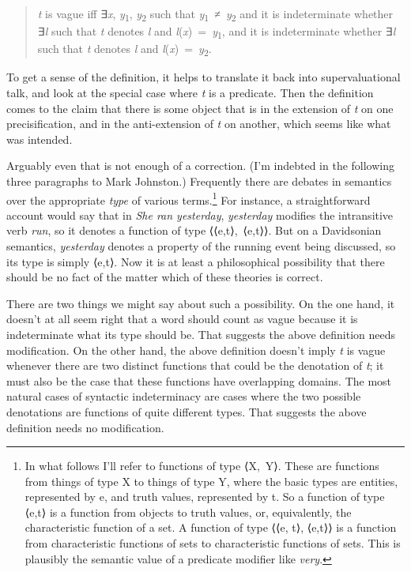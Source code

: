 \documentclass[
  11pt,
  letterpaper,
  DIV=11,
  numbers=noendperiod,
  twoside]{scrartcl}
\begin{document}
\begin{quote}
\emph{t} is vague iff ∃\emph{x}, \emph{y}\textsubscript{1},
\emph{y}\textsubscript{2} such that
\emph{y}\textsubscript{1}~≠~\emph{y}\textsubscript{2} and it is
indeterminate whether ∃\emph{l} such that \emph{t} denotes \emph{l} and
\emph{l}(\emph{x})~=~\emph{y}\textsubscript{1}, and it is indeterminate
whether ∃\emph{l} such that \emph{t} denotes \emph{l} and
\emph{l}(\emph{x})~=~\emph{y}\textsubscript{2}.
\end{quote}

To get a sense of the definition, it helps to translate it back into
supervaluational talk, and look at the special case where \emph{t} is a
predicate. Then the definition comes to the claim that there is some
object that is in the extension of \emph{t} on one precisification, and
in the anti-extension of \emph{t} on another, which seems like what was
intended.

Arguably even that is not enough of a correction. (I'm indebted in the
following three paragraphs to Mark Johnston.) Frequently there are
debates in semantics over the appropriate \emph{type} of various
terms.\footnote{In what follows I'll refer to functions of type ⟨X,~Y⟩.
  These are functions from things of type X to things of type Y, where
  the basic types are entities, represented by e, and truth values,
  represented by t. So a function of type ⟨e,t⟩ is a function from
  objects to truth values, or, equivalently, the characteristic function
  of a set. A function of type ⟨⟨e, t⟩, ⟨e,t⟩⟩ is a function from
  characteristic functions of sets to characteristic functions of sets.
  This is plausibly the semantic value of a predicate modifier like
  \emph{very}.} For instance, a straightforward account would say that
in \emph{She ran yesterday}, \emph{yesterday} modifies the intransitive
verb \emph{run}, so it denotes a function of type ⟨⟨e,t⟩,~⟨e,t⟩⟩. But on
a Davidsonian semantics, \emph{yesterday} denotes a property of the
running event being discussed, so its type is simply ⟨e,t⟩. Now it is at
least a philosophical possibility that there should be no fact of the
matter which of these theories is correct.

There are two things we might say about such a possibility. On the one
hand, it doesn't at all seem right that a word should count as vague
because it is indeterminate what its type should be. That suggests the
above definition needs modification. On the other hand, the above
definition doesn't imply \emph{t} is vague whenever there are two
distinct functions that could be the denotation of \emph{t}; it must
also be the case that these functions have overlapping domains. The most
natural cases of syntactic indeterminacy are cases where the two
possible denotations are functions of quite different types. That
suggests the above definition needs no modification.
\end{document}
